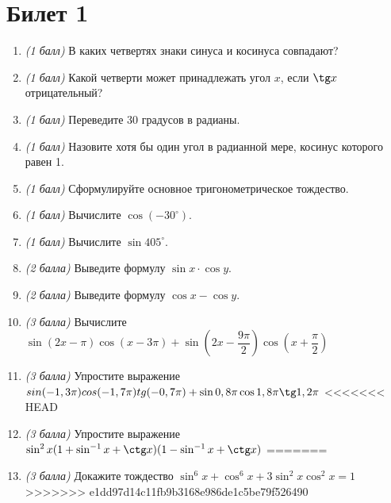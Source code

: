\documentclass[12pt, a4paper]{article}
\begin{document}
	
	\section*{Билет 1}
	\begin{enumerate}
		\item \textit{(1 балл)} В каких четвертях знаки синуса и косинуса совпадают?
		\item \textit{(1 балл)} Какой четверти может принадлежать угол $x$, если $\tg x$ отрицательный?
		\item \textit{(1 балл)} Переведите 30 градусов в радианы.
		\item \textit{(1 балл)} Назовите хотя бы один угол в радианной мере, косинус которого равен 1.
		\item \textit{(1 балл)} Сформулируйте основное тригонометрическое тождество.
		\item \textit{(1 балл)} Вычислите $\cos (-30^{\circ})$.
		\item \textit{(1 балл)} Вычислите $\sin 405^{\circ}$.
		\item \textit{(2 балла)} Выведите формулу $\sin x \cdot \cos y$.
		\item \textit{(2 балла)} Выведите формулу $\cos x - \cos y$.
		\item \textit{(3 балла)} Вычислите $\sin (2x-\pi)  \cos (x-3\pi)  + \sin (2x-\dfrac{9\pi}{2}) \cos (x+\dfrac{\pi}{2})$
		\item \textit{(3 балла)} Упростите выражение $sin(-1,3\pi)cos(-1,7\pi)tg(-0,7\pi)+\sin 0,8\pi \cos 1,8\pi \tg 1,2\pi$
<<<<<<< HEAD
		\item \textit{(3 балла)} Упростите выражение $\sin^2 x(1+\sin^{-1}x + \ctg x)(1 - \sin^{-1}x + \ctg x)$
=======
		\item \textit{(3 балла)} Докажите тождество $\sin^6x + \cos^6x + 3\sin^2x\cos^2x = 1$
>>>>>>> e1dd97d14c11fb9b3168e986de1c5be79f526490
	\end{enumerate}
\end{document}
